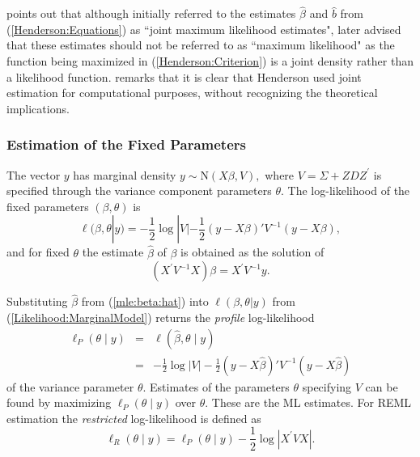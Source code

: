 \documentclass[12pt, a4paper]{report}
\theoremstyle{definition}
\theoremstyle{remark}
\begin{document}
\cite{Robi:BLUP:1991} points out that although \cite{Henderson:1950} initially referred to the estimates $\hat{\beta}$ and $\hat{b}$ from (\ref{Henderson:Equations}) as ``joint maximum likelihood estimates", \cite{Henderson:1973} later advised that these estimates should not be referred to as ``maximum likelihood" as the function being maximized in (\ref{Henderson:Criterion}) is a joint density rather than a likelihood function. \cite{YLee} remarks that it is clear that Henderson used joint estimation for computational purposes, without recognizing the theoretical implications.


\subsubsection{Estimation of the Fixed Parameters}

The vector $y$ has marginal density $y \sim \mathrm{N}(X \beta,V),$ where $V = \Sigma + ZDZ^\prime$ is specified through the variance component parameters $\theta.$ The log-likelihood of the fixed parameters $(\beta, \theta)$ is
\begin{equation}
\ell (\beta, \theta|y) =
-\frac{1}{2} \log |V| -\frac{1}{2}(y -
X \beta)'V^{-1}(y -
X \beta), \label{Likelihood:MarginalModel}
\end{equation}
and for fixed $\theta$ the estimate $\hat{\beta}$ of $\beta$ is obtained as the solution of
\begin{equation}
(X^\prime V^{-1}X) {\beta} = X^\prime V^{-1}y.
\label{mle:beta:hat}
\end{equation}

Substituting $\hat{\beta}$ from (\ref{mle:beta:hat}) into $\ell(\beta, \theta|y)$ from (\ref{Likelihood:MarginalModel}) returns the \emph{profile} log-likelihood
\begin{eqnarray*}
\ell_P(\theta \mid y) &=& \ell(\hat{\beta}, \theta \mid y) \\
&=& -\frac{1}{2} \log |V| -\frac{1}{2}(y - X \hat{\beta})'V^{-1}(y - X \hat{\beta})
\end{eqnarray*}
of the variance parameter $\theta.$ Estimates of the parameters $\theta$ specifying $V$ can be found by maximizing $\ell_P(\theta \mid y)$ over $\theta.$ These are the ML estimates. For REML estimation the \emph{restricted} log-likelihood is defined as
\[
\ell_R(\theta \mid y) =
\ell_P(\theta \mid y) -\frac{1}{2} \log |X^\prime VX |.
\]
\end{document}
